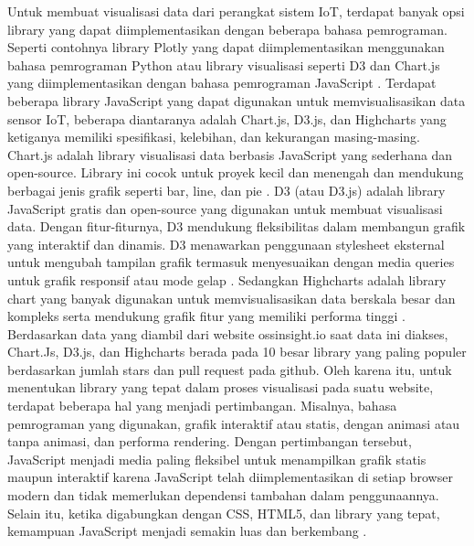 Untuk membuat visualisasi data dari perangkat sistem IoT, terdapat banyak opsi library yang dapat diimplementasikan dengan beberapa bahasa pemrograman. Seperti contohnya library Plotly yang dapat diimplementasikan menggunakan bahasa pemrograman Python \cite{Bostrm2022} atau library visualisasi seperti D3 dan Chart.js yang diimplementasikan dengan bahasa pemrograman JavaScript \cite{Persson2021}. Terdapat beberapa library JavaScript yang dapat digunakan untuk memvisualisasikan data sensor IoT, beberapa diantaranya adalah Chart.js, D3.js, dan Highcharts yang ketiganya memiliki spesifikasi, kelebihan, dan kekurangan masing-masing. Chart.js adalah library visualisasi data berbasis JavaScript yang sederhana dan open-source. Library ini cocok untuk proyek kecil dan menengah dan mendukung berbagai jenis grafik seperti bar, line, dan pie \cite{ChartJs}. D3 (atau D3.js) adalah library JavaScript gratis dan open-source yang digunakan untuk membuat visualisasi data. Dengan fitur-fiturnya, D3 mendukung fleksibilitas dalam membangun grafik yang interaktif dan dinamis. D3 menawarkan penggunaan stylesheet eksternal untuk mengubah tampilan grafik termasuk menyesuaikan dengan media queries untuk grafik responsif atau mode gelap \cite{D3}. Sedangkan Highcharts adalah library chart yang banyak digunakan untuk memvisualisasikan data berskala besar dan kompleks serta mendukung grafik fitur yang memiliki performa tinggi \cite{D3}. Berdasarkan data yang diambil dari website ossinsight.io saat data ini diakses, Chart.Js, D3.js, dan Highcharts berada pada 10 besar library yang paling populer berdasarkan jumlah stars dan pull request pada github.
Oleh karena itu, untuk menentukan library yang tepat dalam proses visualisasi pada suatu website, terdapat beberapa hal yang menjadi pertimbangan. Misalnya, bahasa pemrograman yang digunakan, grafik interaktif atau statis, dengan animasi atau tanpa animasi, dan performa rendering. Dengan pertimbangan tersebut, JavaScript menjadi media paling fleksibel untuk menampilkan grafik statis maupun interaktif karena JavaScript telah diimplementasikan di setiap browser modern dan tidak memerlukan dependensi tambahan dalam penggunaannya. Selain itu, ketika digabungkan dengan CSS, HTML5, dan library yang tepat, kemampuan JavaScript menjadi semakin luas dan berkembang \cite{Persson2021} \cite{Renear2010}.

